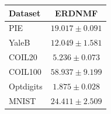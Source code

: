 \begin{tabular}{lc}
\hline
Dataset & ERDNMF \\
\hline
PIE & $19.017\pm0.091$ \\
YaleB & $12.049\pm1.581$ \\
COIL20 & $5.236\pm0.073$ \\
COIL100 & $58.937\pm9.199$ \\
Optdigits & $1.875\pm0.028$ \\
MNIST & $24.411\pm2.509$ \\
\hline
\end{tabular}
